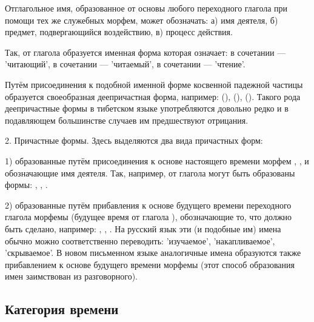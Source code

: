Отглагольное имя, образованное от основы любого переходного глагола при помощи тех же служебных морфем, может обозначать: а) имя деятеля, б) предмет, подвергающийся воздействию, в) процесс действия.

Так, от глагола  образуется именная форма  которая означает:
в сочетании  --- 'читающий',
в сочетании  --- 'читаемый',
в сочетании  --- 'чтение'.

Путём присоединения к подобной именной форме косвенной падежной частицы  образуется своеобразная деепричастная форма, например:
 (),
 (),
 ().
Такого рода деепричастные формы в тибетском языке употребляются довольно редко и в подавляющем большинстве случаев им предшествуют отрицания.

2. Причастные формы. Здесь выделяются два вида причастных форм:

1) образованные путём присоединения к основе настоящего времени морфем , ,  и обозначающие имя деятеля. Так, например, от глагола  могут быть образованы формы:
, , .

2) образованные путём прибавления к основе будущего времени переходного глагола морфемы   (будущее время от глагола ), обозначающие то,
что должно быть сделано, например:
,
,
.
На русский язык эти (и подобные им) имена обычно можно соответственно переводить: 'изучаемое', 'накапливаемое', 'скрываемое'. В новом письменном языке аналогичные имена образуются также прибавлением к основе будущего времени морфемы  (этот способ образования имен заимствован из разговорного).

\subsection{Категория времени}

